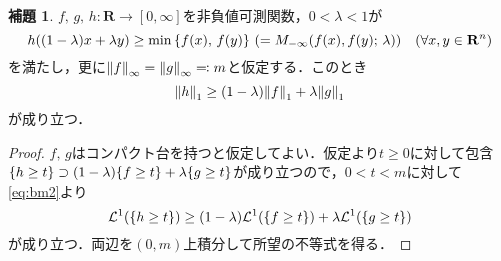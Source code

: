\documentclass[a4j]{ltjsarticle}
\newcommand{\Rset}{\mathbf{R}}
\newcommand{\Lm}{\mathcal{L}}
\newcommand{\1}{\bm{1}}
\newcommand{\M}[4]{M_{#1}\qty(#2,#3;\,#4)}
\numberwithin{equation}{section}
\theoremstyle{definition}
\newtheorem{lem}[thm]{補題}
\begin{document}
\begin{lem}\label{lem:bbl_1}
    $f,\,g,\,h\colon \Rset\to [0,\infty]$を非負値可測関数，$0<\lambda<1$が
    \begin{equation}
        h((1-\lambda)x+\lambda y)\geq \min\qty{f(x),\,f(y)}\ (=\M{-\infty}{f(x)}{f(y)}{\lambda})\quad (\forall x,y\in\Rset^n)\label{eq:bbl_assump}
    \end{equation}
    を満たし，更に$\norm{f}_{\infty}=\norm{g}_{\infty}\eqqcolon m$と仮定する．このとき
    \begin{equation}
        \norm{h}_1\geq (1-\lambda)\norm{f}_1+\lambda\norm{g}_1
    \end{equation}
    が成り立つ．
\end{lem}
\begin{proof}
    $f,\,g$はコンパクト台を持つと仮定してよい．仮定より$t\geq0$に対して包含$\qty{h\geq t}\supset (1-\lambda)\qty{f\geq t}+\lambda\qty{g\geq t}$が成り立つので，$0<t<m$に対して\eqref{eq:bm2}より
    \begin{equation}
        \Lm^1(\qty{h\geq t})\geq (1-\lambda)\Lm^1(\qty{f\geq t})+\lambda \Lm^1(\qty{g\geq t})
    \end{equation}
    が成り立つ．両辺を$(0,m)$上積分して所望の不等式を得る．
\end{proof}
\end{document}
